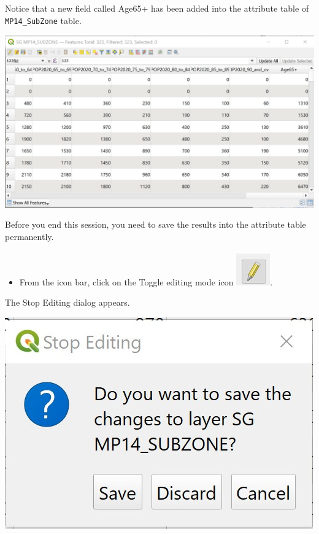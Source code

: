 \documentclass[
  letterpaper,
  DIV=11,
  numbers=noendperiod]{scrreprt}
\providecommand{\tightlist}{%
  \setlength{\itemsep}{0pt}\setlength{\parskip}{0pt}}\usepackage{longtable,booktabs,array}
\begin{document}
Notice that a new field called Age65+ has been added into the attribute
table of \texttt{MP14\_SubZone} table.

\includegraphics{./img03/image31.jpg}

Before you end this session, you need to save the results into the
attribute table permanently.

\begin{itemize}
\tightlist
\item
  From the icon bar, click on the Toggle editing mode icon
  \includegraphics{./img03/image32.jpg}.
\end{itemize}

The Stop Editing dialog appears.

\includegraphics{./img03/image33.jpg}
\end{document}
